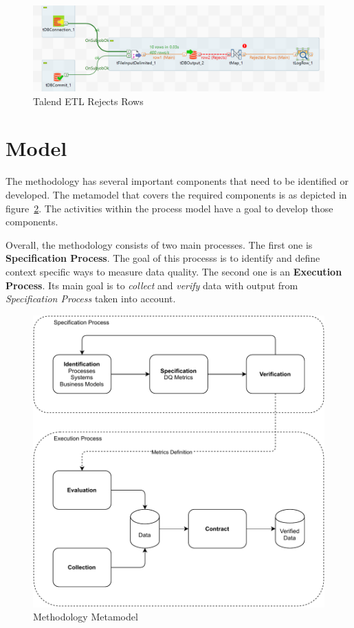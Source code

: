 \begin{figure}[htb]
    \centering
    \includegraphics[width=.8\textwidth]{figures/rejected-rows.png}
    \caption{Talend ETL Rejects Rows}
    \label{fig:rejected-rows}
\end{figure}
\FloatBarrier


\section{Model}

The methodology has several important components that need to be identified or developed.
The metamodel that covers the required components is as depicted in figure~\ref{fig:methodology-metamodel}.
The activities within the process model have a goal to develop those components.

Overall, the methodology consists of two main processes.
The first one is \textbf{Specification Process}.
The goal of this processs is to identify and define context specific ways to measure data quality.
The second one is an \textbf{Execution Process}.
Its main goal is to \textit{collect} and \textit{verify} data with output from \textit{Specification Process} taken into account.

\begin{figure}[htb]
    \centering
    \includegraphics[width=.8\textwidth]{figures/dq-methodology.pdf}
    \caption{Methodology Metamodel}
    \label{fig:methodology-metamodel}
\end{figure}
\FloatBarrier

